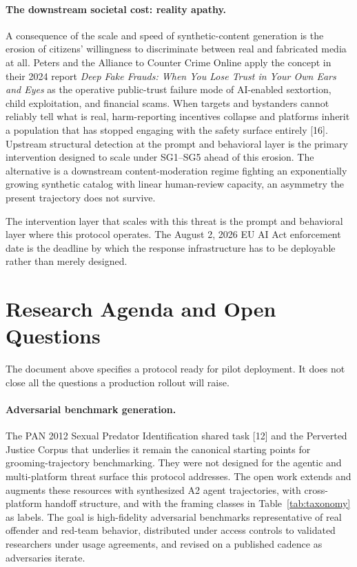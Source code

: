 \documentclass[11pt]{article}
\begin{document}
\paragraph{The downstream societal cost: reality apathy.}
A consequence of the scale and speed of synthetic-content generation is the erosion of citizens' willingness to discriminate between real and fabricated media at all. Peters and the Alliance to Counter Crime Online apply the concept in their 2024 report \emph{Deep Fake Frauds: When You Lose Trust in Your Own Ears and Eyes} as the operative public-trust failure mode of AI-enabled sextortion, child exploitation, and financial scams. When targets and bystanders cannot reliably tell what is real, harm-reporting incentives collapse and platforms inherit a population that has stopped engaging with the safety surface entirely [16]. Upstream structural detection at the prompt and behavioral layer is the primary intervention designed to scale under SG1--SG5 ahead of this erosion. The alternative is a downstream content-moderation regime fighting an exponentially growing synthetic catalog with linear human-review capacity, an asymmetry the present trajectory does not survive.

The intervention layer that scales with this threat is the prompt and behavioral layer where this protocol operates. The August 2, 2026 EU AI Act enforcement date is the deadline by which the response infrastructure has to be deployable rather than merely designed.

\section{Research Agenda and Open Questions}
\label{sec:agenda}

The document above specifies a protocol ready for pilot deployment. It does not close all the questions a production rollout will raise.

\paragraph{Adversarial benchmark generation.} The PAN 2012 Sexual Predator Identification shared task [12] and the Perverted Justice Corpus that underlies it remain the canonical starting points for grooming-trajectory benchmarking. They were not designed for the agentic and multi-platform threat surface this protocol addresses. The open work extends and augments these resources with synthesized A2 agent trajectories, with cross-platform handoff structure, and with the framing classes in Table~\ref{tab:taxonomy} as labels. The goal is high-fidelity adversarial benchmarks representative of real offender and red-team behavior, distributed under access controls to validated researchers under usage agreements, and revised on a published cadence as adversaries iterate.
\end{document}

